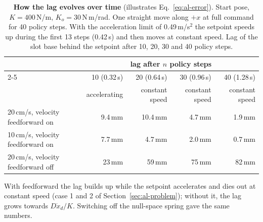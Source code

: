 \begin{table}[h]
  \centering
  \caption{\textbf{How the lag evolves over time} (illustrates Eq.~\eqref{eq:al-error}). Start pose, $K = 400$\,N/m,
  $K_o = 30$\,N\,m/rad. One straight move along $+x$ at full command for 40 policy steps. With the acceleration limit
  of 0.49\,m/s$^2$ the setpoint speeds up during the first 13 steps (0.42\,s) and then moves at constant speed.
  Lag of the slot base behind the setpoint after 10, 20, 30 and 40 policy steps.}
  \label{tab:al-time}
  {\renewcommand{\arraystretch}{1.15}
  \begin{tabular}{lrrrr}
    \toprule
    & \multicolumn{4}{c}{lag after $n$ policy steps} \\
    \cmidrule(lr){2-5}
    & 10 (0.32\,s) & 20 (0.64\,s) & 30 (0.96\,s) & 40 (1.28\,s) \\
    & accelerating & constant speed & constant speed & constant speed \\
    \midrule
    20\,cm/s, velocity feedforward on  & 9.4\,mm & 10.4\,mm & 4.7\,mm & 1.9\,mm \\
    10\,cm/s, velocity feedforward on  & 7.7\,mm & 4.7\,mm  & 2.0\,mm & 0.7\,mm \\
    20\,cm/s, velocity feedforward off & 23\,mm  & 59\,mm   & 75\,mm  & 82\,mm \\
    \bottomrule
  \end{tabular}}

  \smallskip
  {\small With feedforward the lag builds up while the setpoint accelerates and dies out at constant speed (case 1 and 2
  of Section~\ref{sec:al-problem}); without it, the lag grows towards $D\dot x_d/K$. Switching off the null-space
  spring gave the same numbers.}
\end{table}

